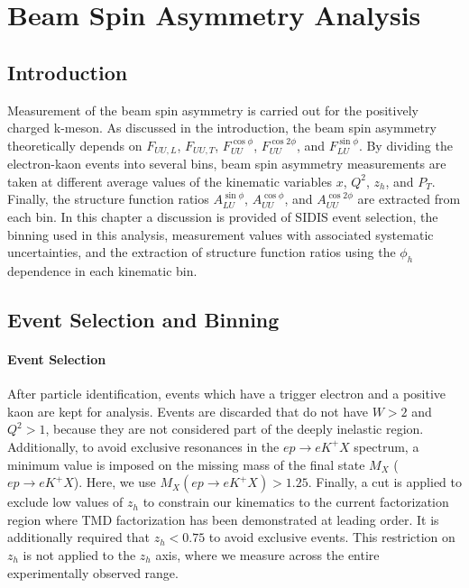 \chapter{Beam Spin Asymmetry Analysis}

\section{Introduction}
Measurement of the beam spin asymmetry is carried out for the positively charged k-meson.  As discussed in the introduction, the beam spin asymmetry theoretically depends on $F_{UU,L}$, $F_{UU,T}$, $F_{UU}^{\cos\phi}$, $F_{UU}^{\cos 2\phi}$, and $F_{LU}^{\sin\phi}$.  By dividing the electron-kaon events into several bins, beam spin asymmetry measurements are taken at different average values of the kinematic variables $x$, $Q^2$, $z_h$, and $P_T$.  Finally, the structure function ratios $A_{LU}^{\sin\phi}$, $A_{UU}^{\cos\phi}$, and $A_{UU}^{\cos 2\phi}$ are extracted from each bin.  In this chapter a discussion is provided of SIDIS event selection, the binning used in this analysis, measurement values with associated systematic uncertainties, and the extraction of structure function ratios using the $\phi_h$ dependence in each kinematic bin.

\section{Event Selection and Binning}
\subsubsection*{Event Selection}
After particle identification, events which have a trigger electron and a positive kaon are kept for analysis.  Events are discarded that do not have $W > 2$ and $Q^2 > 1$, because they are not considered part of the deeply inelastic region.  Additionally, to avoid exclusive resonances in the $ep \rightarrow eK^+X$ spectrum, a minimum value is imposed on the missing mass of the final state $M_X$ ($ep \rightarrow eK^+X$).  Here, we use $M_{X} (ep \rightarrow eK^+X) > 1.25$.  Finally, a cut is applied to exclude low values of $z_h$ to constrain our kinematics to the current factorization region where TMD factorization has been demonstrated at leading order.  It is additionally required that $z_h < 0.75$ to avoid exclusive events.  This restriction on $z_h$ is not applied to the $z_h$ axis, where we measure across the entire experimentally observed range.  

